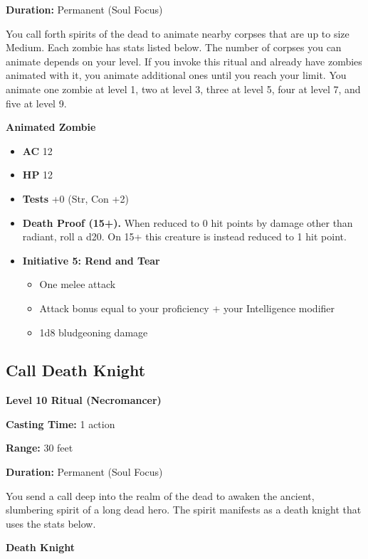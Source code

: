 \documentclass[12pt,letterpaper,twocolumn,openany,nodeprecatedcode,bg=none]{dndbook}
\providecommand{\tightlist}{%
  \setlength{\itemsep}{0pt}\setlength{\parskip}{0pt}}
\begin{document}
\textbf{Duration:} Permanent (Soul Focus)

You call forth spirits of the dead to animate nearby corpses that are up
to size Medium. Each zombie has stats listed below. The number of
corpses you can animate depends on your level. If you invoke this ritual
and already have zombies animated with it, you animate additional ones
until you reach your limit. You animate one zombie at level 1, two at
level 3, three at level 5, four at level 7, and five at level 9.

\textbf{Animated Zombie}

\begin{itemize}
\tightlist
\item
  \textbf{AC} 12
\item
  \textbf{HP} 12
\item
  \textbf{Tests} +0 (Str, Con +2)
\item
  \textbf{Death Proof (15+).} When reduced to 0 hit points by damage
  other than radiant, roll a d20. On 15+ this creature is instead
  reduced to 1 hit point.
\item
  \textbf{Initiative 5: Rend and Tear}

  \begin{itemize}
  \tightlist
  \item
    One melee attack
  \item
    Attack bonus equal to your proficiency + your Intelligence modifier
  \item
    1d8 bludgeoning damage
  \end{itemize}
\end{itemize}

\clearpage

\subsection{Call Death Knight}\label{call-death-knight}

\textbf{Level 10 Ritual (Necromancer)}

\textbf{Casting Time:} 1 action

\textbf{Range:} 30 feet

\textbf{Duration:} Permanent (Soul Focus)

You send a call deep into the realm of the dead to awaken the ancient,
slumbering spirit of a long dead hero. The spirit manifests as a death
knight that uses the stats below.

\textbf{Death Knight}
\end{document}
